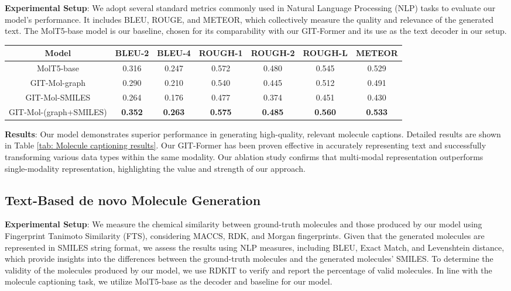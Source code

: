 \documentclass{article}
\begin{document}
\textbf{Experimental Setup}: We adopt several standard metrics commonly used in Natural Language Processing (NLP) tasks to evaluate our model's performance. It includes BLEU, ROUGE, and METEOR, which collectively measure the quality and relevance of the generated text. The MolT5-base model is our baseline, chosen for its comparability with our GIT-Former and its use as the text decoder in our setup.
\begin{table*}[t]
	\centering
    \caption{\textbf{Molecule captioning results}. GIT-Mol demonstrates exceptional performance across various caption generation evaluation metrics. In an ablation study, the employment of this multi-modal model resulted in an impressive 10\%-15\% improvement over single-modality models.}
    \label{tab: Molecule captioning results}  
	\begin{tabular}{c|c|c|c|c|c|c}
	\hline
	\textbf{Model} & \textbf{BLEU-2} & \textbf{BLEU-4} & \textbf{ROUGH-1} & \textbf{ROUGH-2} & \textbf{ROUGH-L} & \textbf{METEOR}\\
		\hline
		MolT5-base & 0.316 & 0.247 & 0.572 & 0.480 & 0.545 & 0.529\\	\hline
		GIT-Mol-graph & 0.290  & 0.210 & 0.540 & 0.445 & 0.512 & 0.491\\
            GIT-Mol-SMILES & 0.264  & 0.176 & 0.477 & 0.374 & 0.451 & 0.430\\
            GIT-Mol-(graph+SMILES) & \textbf{0.352}  & \textbf{0.263} & \textbf{0.575} & \textbf{0.485}& \textbf{0.560} & \textbf{0.533}\\
		\hline
	\end{tabular}
\end{table*}

\textbf{Results}: Our model demonstrates superior performance in generating high-quality, relevant molecule captions. Detailed results are shown in Table \ref{tab: Molecule captioning results}.
Our GIT-Former has been proven effective in accurately representing text and successfully transforming various data types within the same modality. Our ablation study confirms that multi-modal representation outperforms single-modality representation, highlighting the value and strength of our approach.

\subsection{Text-Based de novo Molecule Generation}
\textbf{Experimental Setup}: We measure the chemical similarity between ground-truth molecules and those produced by our model using Fingerprint Tanimoto Similarity (FTS), considering MACCS, RDK, and Morgan fingerprints. Given that the generated molecules are represented in SMILES string format, we assess the results using NLP measures, including BLEU, Exact Match, and Levenshtein distance, which provide insights into the differences between the ground-truth molecules and the generated molecules' SMILES. To determine the validity of the molecules produced by our model, we use RDKIT to verify and report the percentage of valid molecules. In line with the molecule captioning task, we utilize MolT5-base as the decoder and baseline for our model.
 
\end{document}
